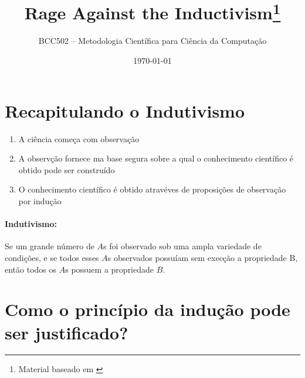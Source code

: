 \documentclass[9pt,a4paper]{extarticle}
\begin{document}
\title{Rage Against the Inductivism\footnote{Material baseado em \citep{chalmers1993ciencia}}}
\author{BCC502 -- Metodologia Científica para Ciência da Computação}
\date{\today}
\maketitle

\tableofcontents

\section{Recapitulando o Indutivismo}

\begin{enumerate}
    \item A ciência começa com observação
    \item A observção fornece ma base segura sobre a qual o conhecimento científico é obtido pode ser construído
    \item O conhecimento científico é obtido atravéves de proposições de observação por indução
\end{enumerate}

\paragraph{Indutivismo:} Se um grande número de $A$s foi observado sob uma ampla variedade de condições, e se todos esses $A$s observados possuíam sem execção a propriedade B, então todos os $A$s possuem a propriedade $B$.

\section{Como o princípio da indução pode ser justificado?}
\end{document}
